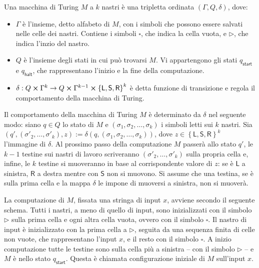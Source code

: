 \begin{defn}\label{defn:TM}
 Una {\upshape macchina di Turing} $M$ a $k$ nastri è una tripletta ordinata $\left(\Gamma, Q, \delta \right)$, dove:
 \begin{itemize}
  \item $\Gamma$ è l'insieme, detto {\upshape alfabeto} di $M$, con i simboli che possono essere salvati nelle celle dei nastri.
  Contiene i simboli $\square$, che indica la cella vuota, e $\rhd$, che indica l'inzio del nastro.
  \item $Q$ è l'insieme degli {\upshape stati} in cui può trovarsi $M$.
  Vi appartengono gli stati $q_{\mathsf{start}}$ e $q_{\mathsf{halt}}$, che rappresentano l'inizio e la fine della computazione.
  \item $\delta: Q \cross \Gamma^k \to Q \cross \Gamma^{k-1} \cross \left\{\mathsf{L}, \mathsf{S}, \mathsf{R}\right\}^k$ è detta {\upshape funzione di transizione} e regola il comportamento della macchina di Turing.
 \end{itemize}
\end{defn}
Il comportamento della macchina di Turing $M$ è determinato da $\delta$ nel seguente modo:
siano $q \in Q$ lo stato di $M$ e $\left(\sigma_1, \sigma_2, \dots, \sigma_k \right)$ i simboli letti sui $k$ nastri.
Sia $\left(q', (\sigma'_2, \dots, \sigma'_k), z\right) := \delta\left(q, (\sigma_1, \sigma_2, \dots, \sigma_k) \right)$, dove $z \in \left\{\mathsf{L}, \mathsf{S}, \mathsf{R}\right\}^k$ l'immagine di $\delta$.
Al prossimo passo della computazione $M$ passerà allo stato $q'$, le $k-1$ testine sui nastri di lavoro scriveranno $(\sigma'_2, \dots, \sigma'_k)$ sulla propria cella e, infine, le $k$ testine si muoveranno in base al corrispondente valore di $z$: se è $\mathsf{L}$ a sinistra, $\mathsf{R}$ a destra mentre con $\mathsf{S}$ non si muovono.
Si assume che una testina, se è sulla prima cella e la mappa $\delta$ le impone di muoversi a sinistra, non si muoverà.

La computazione di $M$, fissata una stringa di input $x$, avviene secondo il seguente schema.
Tutti i nastri, a meno di quello di input, sono inizializzati con il simbolo $\rhd$ sulla prima cella e ogni altra cella vuota, ovvero con il simbolo $\square$.
Il nastro di input è inizializzato con la prima cella a $\rhd$, seguita da una sequenza finita di celle non vuote, che rappresentano l'input $x$, e il resto con il simbolo $\square$.
A inizio computazione tutte le testine sono sulla cella più a sinistra -- con il simbolo $\rhd$ -- e $M$ è nello stato $q_{\mathsf{start}}$. Questa è chiamata configurazione iniziale di $M$ sull'input $x$.

